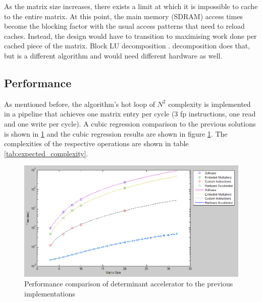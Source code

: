 \documentclass[]{article}
\begin{document}
As the matrix size increases, there exists a limit at which it is impossible to cache to the entire matrix. At this point, the main memory (SDRAM) access times become the blocking factor with the usual access patterns that need to reload caches. Instead, the design would have to transition to maximising work done per cached piece of the matrix. Block LU decomposition \cite{LUgen}. decomposition does that, but is a different algorithm and would need different hardware as well.

\subsection{Performance} %
\label{sub:performancedet}


As mentioned before, the algorithm’s hot loop of $N^2$ complexity is implemented in a pipeline that achieves one matrix entry per cycle (3 fp instructions, one read and one write per cycle). A cubic regression comparison to the previous solutions is shown in \ref{fig:det_bench_results} and the cubic regression results are shown in figure \ref{fig:det_bench_results}. The complexities of the respective operations are shown in table \ref{tab:expected_complexity}.
\begin{figure}[tbp]
	\begin{center}
		\includegraphics[width = \textwidth]{detcalcperf.PNG}
	\end{center}
	\caption{Performance comparison of determinant accelerator to the previous implementations}
	\label{fig:det_bench_results}
\end{figure}
	
\end{document}
